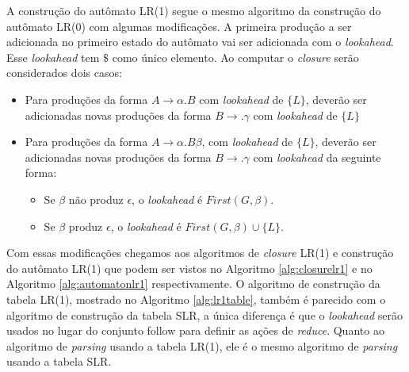 A construção do autômato LR(1) segue o mesmo algoritmo da construção do autômato LR(0) com algumas modificações. A primeira produção a ser adicionada no primeiro estado do autômato vai ser adicionada com o \textit{lookahead}. Esse \textit{lookahead} tem $\$$ como único elemento. Ao computar o \textit{closure} serão considerados dois casos:
\begin{itemize}[label=$\sbullet$]
    \item Para produções da forma $A \rightarrow \alpha . B$ com \textit{lookahead} de $\{L\}$, deverão ser adicionadas novas produções da forma $B \rightarrow . \gamma$ com \textit{lookahead} de $\{L\}$
    \item Para produções da forma $A \rightarrow \alpha.B\beta$, com \textit{lookahead} de $\{L\}$, deverão ser adicionadas novas produções da forma $B \rightarrow . \gamma$ com \textit{lookahead} da seguinte forma:
          \begin{itemize}
              \item Se $\beta$ não produz $\epsilon$, o \textit{lookahead} é $First(G,\beta)$.
              \item Se $\beta$ produz $\epsilon$, o \textit{lookahead} é $First(G,\beta)\cup\{L\}$.
          \end{itemize}
\end{itemize}

Com essas modificações chegamos aos algoritmos de \textit{closure} LR(1) e construção do autômato LR(1) que podem ser vistos no Algoritmo \ref{alg:closurelr1} e no Algoritmo \ref{alg:automatonlr1} respectivamente. O algoritmo de construção da tabela LR(1), mostrado no Algoritmo \ref{alg:lr1table}, também é parecido com o algoritmo de construção da tabela SLR, a única diferença é que o \textit{lookahead} serão usados no lugar do conjunto follow para definir as ações de \textit{reduce}. Quanto ao algoritmo de \textit{parsing} usando a tabela LR(1), ele é o mesmo algoritmo de \textit{parsing} usando a tabela SLR.

